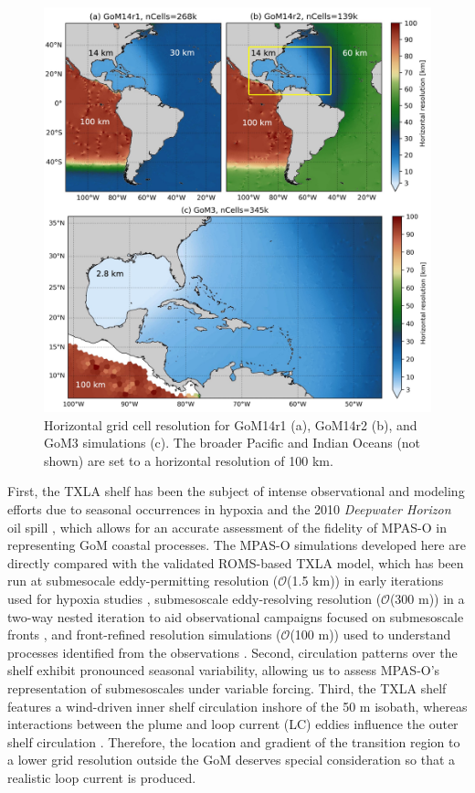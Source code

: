 \begin{figure}[t!]
\centerline{\includegraphics[width = \textwidth]{figures/scgsr/gom_resolutions.jpg}}
    \caption{Horizontal grid cell resolution for GoM14r1 (a), GoM14r2 (b), and GoM3 simulations (c). The broader Pacific and Indian Oceans (not shown) are set to a horizontal resolution of 100 km.}
    \label{fig:mesh_overview}
\end{figure}

First, the TXLA shelf has been the subject of intense observational and modeling efforts due to seasonal occurrences in hypoxia and the 2010 \textit{Deepwater Horizon} oil spill \citep{bianchi2010science,  dukhovskoy2021development, Zhang_2012_forecast}, which allows for an accurate assessment of the fidelity of MPAS-O in representing GoM coastal processes. The MPAS-O simulations developed here are directly compared with the validated ROMS-based TXLA model, which has been run at submesocale eddy-permitting resolution ($\mathcal{O}$(1.5 km)) in early iterations used for hypoxia studies \citep{ruiz2021small, Zhang_2012_numerical}, submesoscale eddy-resolving resolution ($\mathcal{O}$(300 m)) in a two-way nested iteration to aid observational campaigns focused on submesoscale fronts \citep{Qu_2022_NIW, Schlichting23}, and front-refined resolution simulations ($\mathcal{O}$(100 m)) used to understand processes identified from the observations \citep{qu2022rapid}. Second, circulation patterns over the shelf exhibit pronounced seasonal variability, allowing us to assess MPAS-O's representation of submesoscales under variable forcing. Third, the TXLA shelf features a wind-driven inner shelf circulation inshore of the 50 m isobath, whereas interactions between the plume and loop current (LC) eddies influence the outer shelf circulation \citep{zhang2014wind}. Therefore, the location and gradient of the transition region to a lower grid resolution outside the GoM deserves special consideration so that a realistic loop current is produced.

